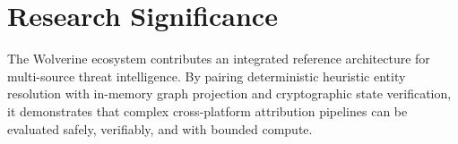 \section{Research Significance}
\label{sec:significance}

The Wolverine ecosystem contributes an integrated reference architecture for multi-source threat intelligence. By pairing deterministic heuristic entity resolution with in-memory graph projection and cryptographic state verification, it demonstrates that complex cross-platform attribution pipelines can be evaluated safely, verifiably, and with bounded compute.
